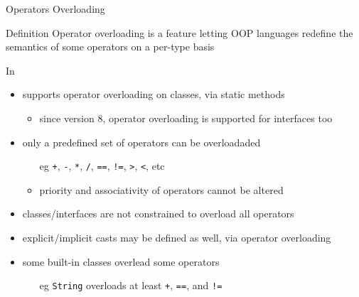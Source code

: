\documentclass[presentation]{beamer}
\begin{document}
\begin{frame}[allowframebreaks]{Operators Overloading}
  \begin{exampleblock}{Definition}\centering
    Operator overloading is a feature letting OOP languages redefine the semantics of some operators on a per-type basis
  \end{exampleblock}

  \begin{block}{In \dotnet}
    \begin{itemize}
      \item \dotnet supports operator overloading on classes, via static methods
      \begin{itemize}
        \item since version 8, operator overloading is supported for interfaces too
      \end{itemize}

      \item only a predefined set of operators can be overloadaded
      \begin{itemize}
        \item[eg] \texttt{+}, \texttt{-}, \texttt{*}, \texttt{/}, \texttt{==}, \texttt{!=}, \texttt{>}, \texttt{<}, etc
        \item priority and associativity of operators cannot be altered
      \end{itemize}

      \item classes/interfaces are not constrained to overload all operators
      
      \item explicit/implicit casts may be defined as well, via operator overloading
      
      \item some built-in classes overlead some operators
      \begin{itemize}
        \item[eg] \texttt{String} overloads at least \texttt{+}, \texttt{==}, and \texttt{!=}
      \end{itemize}
    \end{itemize}
  \end{block}


\end{frame}
\end{document}
